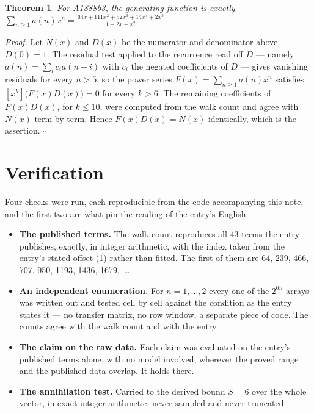 \documentclass[11pt]{article}
\newtheorem{theorem}{Theorem}
\theoremstyle{definition}
\begin{document}
\begin{theorem} For A188863, the generating function is exactly $\sum_{n\ge 1} a(n)x^n = \frac{64x + 111x^{2} + 52x^{3} + 14x^{4} + 2x^{5}}{1 - 2x + x^{2}}$.\end{theorem}

{\itshape Proof.} Let $N(x)$ and $D(x)$ be the numerator and denominator above, $D(0)=1$. The residual test applied to the recurrence read off $D$ --- namely $a(n) = \sum_i c_i a(n-i)$ with $c_i$ the negated coefficients of $D$ --- gives vanishing residuals for every $n > 5$, so the power series $F(x)=\sum_{n\ge 1}a(n)x^n$ satisfies $[x^k]\bigl(F(x)D(x)\bigr) = 0$ for every $k > 6$. The remaining coefficients of $F(x)D(x)$, for $k \le 10$, were computed from the walk count and agree with $N(x)$ term by term. Hence $F(x)D(x) = N(x)$ identically, which is the assertion. $\square$

\section{Verification}

Four checks were run, each reproducible from the code accompanying this note, and the first two are what pin the reading of the entry's English.

\begin{itemize}

\item {\bfseries The published terms.} The walk count reproduces all 43 terms the entry publishes, exactly, in integer arithmetic, with the index taken from the entry's stated offset (1) rather than fitted. The first of them are 64, 239, 466, 707, 950, 1193, 1436, 1679,~\dots

\item {\bfseries An independent enumeration.} For $n = 1,\dots,2$ every one of the $2^{6n}$ arrays was written out and tested cell by cell against the condition as the entry states it --- no transfer matrix, no row window, a separate piece of code. The counts agree with the walk count and with the entry.

\item {\bfseries The claim on the raw data.} Each claim was evaluated on the entry's published terms alone, with no model involved, wherever the proved range and the published data overlap. It holds there.

\item {\bfseries The annihilation test.} Carried to the derived bound $S = 6$ over the whole vector, in exact integer arithmetic, never sampled and never truncated.

\end{itemize}
\end{document}
